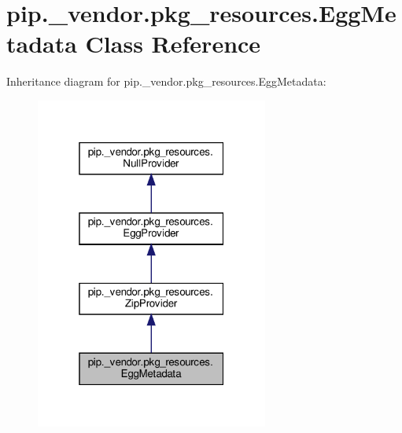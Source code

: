 \hypertarget{classpip_1_1__vendor_1_1pkg__resources_1_1EggMetadata}{}\section{pip.\+\_\+vendor.\+pkg\+\_\+resources.\+Egg\+Metadata Class Reference}
\label{classpip_1_1__vendor_1_1pkg__resources_1_1EggMetadata}


Inheritance diagram for pip.\+\_\+vendor.\+pkg\+\_\+resources.\+Egg\+Metadata\+:
\nopagebreak
\begin{figure}[H]
\begin{center}
\leavevmode
\includegraphics[width=217pt]{classpip_1_1__vendor_1_1pkg__resources_1_1EggMetadata__inherit__graph}
\end{center}
\end{figure}


